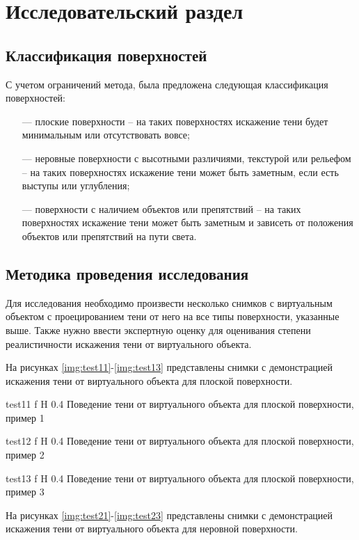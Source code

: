 \chapter{Исследовательский раздел}

\section{Классификация поверхностей}

С учетом ограничений метода, была предложена следующая классификация поверхностей:

\begin{itemize}
	\item[---] плоские поверхности -- на таких поверхностях искажение тени будет минимальным или отсутствовать вовсе;
	\item[---] неровные поверхности с высотными различиями, текстурой или рельефом -- на таких поверхностях искажение тени может быть заметным, если есть выступы или углубления;
	\item[---] поверхности с наличием объектов или препятствий -- на таких поверхностях искажение тени может быть заметным и зависеть от положения объектов или препятствий на пути света.
\end{itemize}

\section{Методика проведения исследования}

Для исследования необходимо произвести несколько снимков с виртуальным объектом с проецированием тени от него на все типы поверхности, указанные выше. Также нужно ввести экспертную оценку для оценивания степени реалистичности искажения тени от виртуального объекта.

На рисунках \ref{img:test11}-\ref{img:test13} представлены снимки с демонстрацией искажения тени от виртуального объекта для плоской поверхности.

{test11}
{f}
{H}
{0.4\textwidth}
{Поведение тени от виртуального объекта для плоской поверхности, пример 1}

{test12}
{f}
{H}
{0.4\textwidth}
{Поведение тени от виртуального объекта для плоской поверхности, пример 2}

{test13}
{f}
{H}
{0.4\textwidth}
{Поведение тени от виртуального объекта для плоской поверхности, пример 3}

На рисунках \ref{img:test21}-\ref{img:test23} представлены снимки с демонстрацией искажения тени от виртуального объекта для неровной поверхности.

